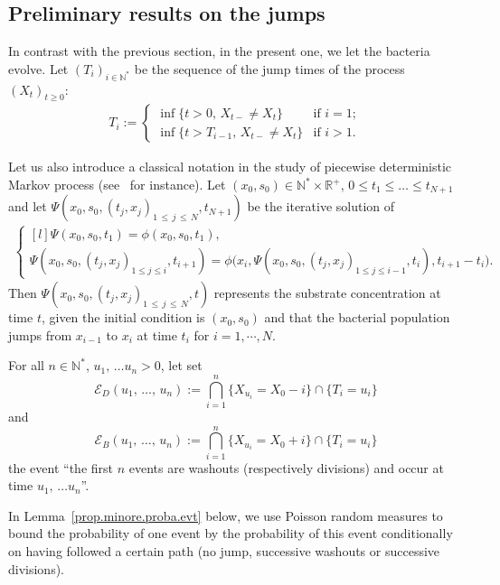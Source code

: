 \documentclass[AHL,Unicode,longabstracts,published]{cedram}
\newcommand{\RR}{\mathbb{R}}
\newcommand{\NN}{\mathbb{N}}
\newcommand{\clE}{\mathcal{E}}
\newcommand{\1}{\mathbf{1}}
\begin{document}
\subsection{Preliminary results on the jumps}\label{sec:preliminary.jumps}


In contrast with the previous section, in the present one, we let the bacteria evolve. Let $(T_i)_{i \in \NN^*}$ be the sequence of the jump times of the process $(X_t)_{t\geq 0}$:
\begin{align*}
T_i :=
\begin{cases}
\inf\{t> 0, \, X_{t-}\neq X_t\} & \text{if $i=1$};\\
\inf\{t>T_{ i-1}, \, X_{t-}\neq X_t\}& \text{if $i>1$.}
\end{cases}
\end{align*}

Let us also introduce a classical notation in the study of piecewise deterministic Markov process (see~\cite{BLMZ15} for instance). Let $(x_0,s_0)\in \NN^*\times \RR^+$, $0\leq t_1\leq \dots \leq t_{N+1}$ and let $\Psi\left(x_0,s_0,(t_j,x_j)_{1\,\leq\,j\,\leq\,N},t_{N+1}\right)$ be the iterative solution of
\begin{align}\label{eq:defPsi}
\left\{
\begin{matrix*}[l]
\Psi(x_0,s_0,t_1) = \phi(x_0,s_0,t_1), \\
\Psi\left(x_0,s_0,(t_j,x_j)_{1\leq j\leq i},t_{i+1}\right)
= \phi\Big(x_i,\Psi\left(x_0,s_0,(t_j,x_j)_{1\leq j\leq i-1},t_i\right), t_{i+1}-t_i\Big).
\end{matrix*}
\right.
\end{align}
Then $\Psi(x_0,s_0,(t_j,x_j)_{1\,\leq \,j\,\leq\,N},t)$ represents the substrate concentration at time $t$, given the initial condition is $(x_0,s_0)$ and that the bacterial population jumps from $x_{i-1}$ to $x_i$ at time $t_i$ for $i=1,\cdots,N$.


For all $n\in\NN^*$, $u_1,\,\dots u_n>0$, let set
\[
\clE_D(u_1,\,\dots,\,u_n):=\bigcap_{i=1}^{n}\{X_{u_i}=X_0 -i\} \cap \{T_i=u_i\}
\]
and
\[
\clE_B(u_1,\,\dots,\,u_n):=\bigcap_{i=1}^{n}\{X_{u_i}=X_0 +i\} \cap \{T_i=u_i\}
\]
the event ``the first $n$ events are washouts (respectively divisions) and occur at time $u_1,\,\dots u_n$''.


In Lemma~\ref{prop.minore.proba.evt} below, we use Poisson random measures to bound the probability of one event by the probability of this event conditionally on having followed a certain path (no jump, successive washouts or successive divisions).
\end{document}
